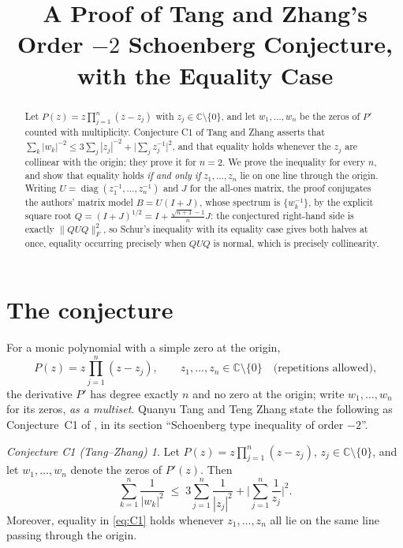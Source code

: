 \documentclass[11pt]{amsart}
\title[The order $-2$ Schoenberg conjecture, with equality]
{A Proof of Tang and Zhang's Order $-2$ Schoenberg Conjecture,
with the Equality Case}
\date{}
\theoremstyle{remark}
\newtheorem*{conjecture}{Conjecture C1 (Tang--Zhang)}
\newcommand{\CC}{\mathbb{C}}
\newcommand{\Frob}[1]{\lVert #1\rVert_F}
\newcommand{\diag}{\operatorname{diag}}
\begin{document}
\begin{abstract}
Let $P(z)=z\prod_{j=1}^{n}(z-z_j)$ with $z_j\in\CC\setminus\{0\}$, and let
$w_1,\ldots,w_n$ be the zeros of $P'$ counted with multiplicity. Conjecture C1
of Tang and Zhang asserts that
$\sum_k|w_k|^{-2}\le 3\sum_j|z_j|^{-2}+\bigl|\sum_j z_j^{-1}\bigr|^{2}$, and
that equality holds whenever the $z_j$ are collinear with the origin; they
prove it for $n=2$. We prove the inequality for every $n$, and show that
equality holds \emph{if and only if} $z_1,\ldots,z_n$ lie on one line through
the origin. Writing $U=\diag(z_1^{-1},\ldots,z_n^{-1})$ and $J$ for the
all-ones matrix, the proof conjugates the authors' matrix model $B=U(I+J)$,
whose spectrum is $\{w_k^{-1}\}$, by the explicit square root
$Q=(I+J)^{1/2}=I+\frac{\sqrt{n+1}-1}{n}J$: the conjectured right-hand side is
exactly $\Frob{QUQ}^{2}$, so Schur's inequality with its equality case gives
both halves at once, equality occurring precisely when $QUQ$ is normal, which
is precisely collinearity.
\end{abstract}

\maketitle

\section{The conjecture}

For a monic polynomial with a simple zero at the origin,
\begin{equation}\label{eq:P}
  P(z)=z\prod_{j=1}^{n}(z-z_j),
  \qquad z_1,\ldots,z_n\in\CC\setminus\{0\}
  \quad\text{(repetitions allowed),}
\end{equation}
the derivative $P'$ has degree exactly $n$ and no zero at the origin; write
$w_1,\ldots,w_n$ for its zeros, \emph{as a multiset}. Quanyu Tang and Teng
Zhang state the following as Conjecture~C1 of \cite{TZ}, in its section
``Schoenberg type inequality of order $-2$''.

\begin{conjecture}
Let $P(z)=z\prod_{j=1}^{n}(z-z_j)$, $z_j\in\CC\setminus\{0\}$, and let
$w_1,\ldots,w_n$ denote the zeros of $P'(z)$. Then
\begin{equation}\label{eq:C1}
  \sum_{k=1}^{n}\frac{1}{|w_k|^{2}}
  \;\le\;
  3\sum_{j=1}^{n}\frac{1}{|z_j|^{2}}
  +\Biggl|\sum_{j=1}^{n}\frac{1}{z_j}\Biggr|^{2}.
\end{equation}
Moreover, equality in \eqref{eq:C1} holds whenever $z_1,\ldots,z_n$ all lie on
the same line passing through the origin.
\end{conjecture}
\end{document}
